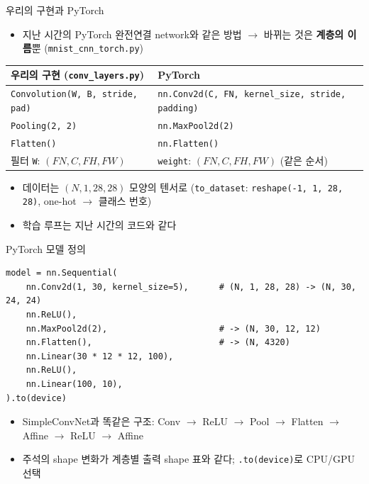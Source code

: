 \documentclass[aspectratio=169,11pt]{beamer}
\begin{document}
\begin{frame}{우리의 구현과 PyTorch}
\begin{itemize}
\item 지난 시간의 PyTorch 완전연결 network와 같은 방법 $\to$ 바뀌는 것은 \textbf{계층의 이름}뿐 (\texttt{mnist\_cnn\_torch.py})
\end{itemize}
\vskip2mm
\centering
\footnotesize
\begin{tabular}{@{}ll@{}}
\toprule
우리의 구현 (\texttt{conv\_layers.py}) & PyTorch \\
\midrule
\texttt{Convolution(W, B, stride, pad)} & \texttt{nn.Conv2d(C, FN, kernel\_size, stride, padding)} \\
\texttt{Pooling(2, 2)} & \texttt{nn.MaxPool2d(2)} \\
\texttt{Flatten()} & \texttt{nn.Flatten()} \\
필터 \texttt{W}: $(FN,C,FH,FW)$ & \texttt{weight}: $(FN,C,FH,FW)$ (같은 순서) \\
\bottomrule
\end{tabular}
\raggedright
\vskip3mm
\begin{itemize}
\item 데이터는 $(N,1,28,28)$ 모양의 텐서로 (\texttt{to\_dataset}: \texttt{reshape(-1, 1, 28, 28)}, one-hot $\to$ 클래스 번호)
\item 학습 루프는 지난 시간의 코드와 같다
\end{itemize}
\end{frame}

\begin{frame}[fragile]{PyTorch 모델 정의}
\begin{lstlisting}[basicstyle=\ttfamily\small]
model = nn.Sequential(
    nn.Conv2d(1, 30, kernel_size=5),      # (N, 1, 28, 28) -> (N, 30, 24, 24)
    nn.ReLU(),
    nn.MaxPool2d(2),                      # -> (N, 30, 12, 12)
    nn.Flatten(),                         # -> (N, 4320)
    nn.Linear(30 * 12 * 12, 100),
    nn.ReLU(),
    nn.Linear(100, 10),
).to(device)
\end{lstlisting}
\begin{itemize}
\item SimpleConvNet과 똑같은 구조: Conv $\to$ ReLU $\to$ Pool $\to$ Flatten $\to$ Affine $\to$ ReLU $\to$ Affine
\item 주석의 shape 변화가 계층별 출력 shape 표와 같다; \texttt{.to(device)}로 CPU/GPU 선택
\end{itemize}
\end{frame}
\end{document}
